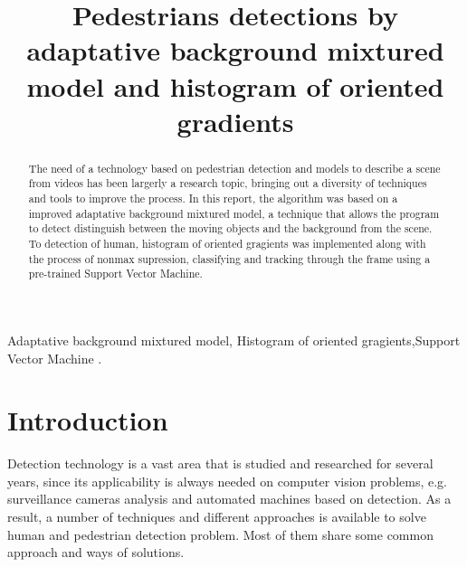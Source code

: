 \documentclass[conference]{IEEEtran}
\begin{document}
\title{Pedestrians detections by adaptative background mixtured model and histogram of oriented gradients\\
}

\author{
\and
{}
}

\maketitle

\begin{abstract}
The need of a technology based on pedestrian detection and models to describe a scene from videos has been largerly a research topic, bringing out a diversity of techniques and tools to improve the process. In this report, the algorithm was based on a improved adaptative  background mixtured model, a technique that allows the program to detect distinguish between the moving objects and the background from the scene. To detection of human, histogram of oriented gragients was implemented along with the process of nonmax supression, classifying and tracking through the frame using a  pre-trained Support Vector Machine.
\end{abstract}

\begin{IEEEkeywords}
Adaptative  background mixtured model, Histogram of oriented gragients,Support Vector Machine .
\end{IEEEkeywords}

\section{Introduction}

	Detection technology is a vast area that is studied and researched for several years, since its applicability is always needed on computer vision problems, e.g. surveillance cameras analysis and automated machines based on detection. As a result, a number of techniques and different approaches is available to solve human and pedestrian detection problem. Most of them share some common approach and ways of solutions. 
	
\end{document}
